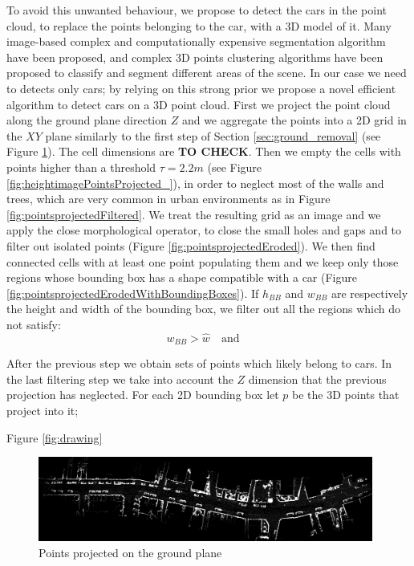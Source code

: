 
To avoid this unwanted behaviour, we propose to detect the cars in the point cloud, to replace the points belonging to the car, with a 3D model of it.
Many image-based complex and computationally expensive segmentation algorithm have been proposed, and complex 3D points clustering algorithms have been proposed to  classify and segment different areas of the scene. 
In our case we  need to detects only cars; by relying on this strong prior we propose a novel efficient algorithm to detect cars on a 3D point cloud.
First we project the point cloud along the  ground plane direction $Z$ and we aggregate the points into a 2D grid in the $XY$ plane similarly to the first step of Section \ref{sec:ground_removal} (see Figure \ref{fig:pointsprojected}). 
The cell dimensions are \textbf{TO CHECK}.
Then we empty the cells  with points higher than a threshold $\tau=2.2m$ (see Figure \ref{fig:heightimagePointsProjected_}), in order to neglect most of the walls and trees, which are very common in urban environments as in Figure \ref{fig:pointsprojectedFiltered}.
We treat the resulting grid as an image and we apply the close morphological operator, to close the small holes and gaps and to filter out isolated points (Figure \ref{fig:pointsprojectedEroded}).
We then find connected cells with at least one point populating them and we keep only those regions whose bounding box has a shape compatible with a car (Figure \ref{fig:pointsprojectedErodedWithBoundingBoxes}). 
If $h_{BB}$ and $w_{BB}$ are respectively the height and width of the bounding box, we filter out all the regions which do not satisfy:
\begin{equation}
 w_{BB} > \hat{w} \quad \text{and} \quad 
\end{equation}

After the previous step we obtain sets of points which likely belong to cars. 
In the last filtering step we take into account the $Z$ dimension that the previous projection has neglected.
For each 2D bounding box let $p$ be the 3D points that project into it; 

Figure \ref{fig:drawing}

\begin{figure}[tp]
 \centering
 \includegraphics[width=0.98\textwidth]{./img/ch-laser/pointsprojected}
 \caption{Points projected on the ground plane}
 \label{fig:pointsprojected}
\end{figure}


